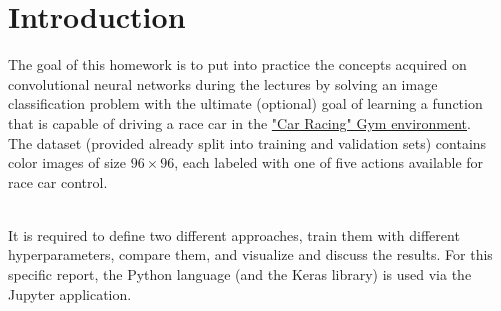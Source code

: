 \section{Introduction}
The goal of this homework is to put into practice the concepts acquired on convolutional neural networks during the lectures by solving an image classification problem with the ultimate (optional) goal of learning a function that is capable of driving a race car in the \href{https://gymnasium.farama.org/environments/box2d/car_racing/}{"Car Racing" Gym environment}.
\\The dataset (provided already split into training and validation sets) contains color images of size $96 \times 96$, each labeled with one of five actions available for race car control.

\noindent \\It is required to define two different approaches, train them with different hyperparameters, compare them, and visualize and discuss the results.
For this specific report, the Python language (and the Keras library) is used via the Jupyter application.